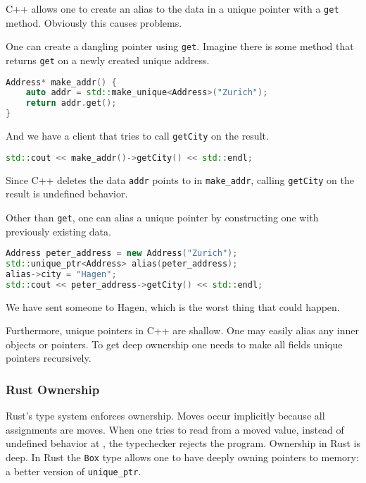 \documentclass{article}
\begin{document}
C++ allows one to create an alias to the data in a unique pointer with a \texttt{get} method.
Obviously this causes problems.

\begin{example}
  One can create a dangling pointer using \texttt{get}.
  Imagine there is some method that returns \texttt{get} on a newly created unique address.
\begin{lstlisting}[escapechar=|, language=C++]
Address* make_addr() {
    auto addr = std::make_unique<Address>("Zurich");
    return addr.get();
}
\end{lstlisting}
  And we have a client that tries to call \texttt{getCity} on the result.
\begin{lstlisting}[escapechar=|, language=C++]
std::cout << make_addr()->getCity() << std::endl;
\end{lstlisting}
  Since C++ deletes the data \texttt{addr} points to in \texttt{make\_addr}, calling \texttt{getCity} on the result is undefined behavior.
\end{example}

\begin{example}
  Other than \texttt{get}, one can alias a unique pointer by constructing one with previously existing data.
\begin{lstlisting}[escapechar=|, language=C++]
Address peter_address = new Address("Zurich");
std::unique_ptr<Address> alias(peter_address);
alias->city = "Hagen";
std::cout << peter_address->getCity() << std::endl;
\end{lstlisting}
  We have sent someone to Hagen, which is the worst thing that could happen.
\end{example}

Furthermore, unique pointers in C++ are shallow.
One may easily alias any inner objects or pointers.
To get deep ownership one needs to make all fields unique pointers recursively.

\subsubsection{Rust Ownership}

Rust's type system enforces ownership.
Moves occur implicitly because all assignments are moves.
When one tries to read from a moved value, instead of undefined behavior at \runtime{}, the typechecker rejects the program.
Ownership in Rust is deep.
In Rust the \texttt{Box} type allows one to have deeply owning pointers to memory: a better version of \texttt{unique\_ptr}.
\end{document}
